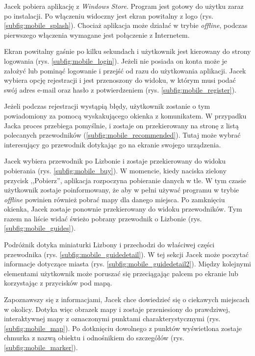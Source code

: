 \documentclass{book}
\begin{document}
		Jacek pobiera aplikację z \emph{Windows Store}. Program jest gotowy do użytku zaraz po instalacji. Po włączeniu widoczny jest ekran powitalny z logo (rys.\ref{subfig:mobile_splash}). Chociaż aplikacja może działać w trybie \emph{offline}, podczas pierwszego włączenia wymagane jest połączenie z Internetem. 
		
		Ekran powitalny gaśnie po kilku sekundach i użytkownik jest kierowany do strony logowania (rys. \ref{subfig:mobile_login}). Jeżeli nie posiada on konta może je założyć lub pominąć logowanie i przejść od razu do użytkowania aplikacji. Jacek wybiera opcję rejestracji i jest przenoszony do widoku, w którym musi podać swój adres e-mail oraz hasło z potwierdzeniem (rys. \ref{subfig:mobile_register}). 
		
		Jeżeli podczas rejestracji wystąpią błędy, użytkownik zostanie o tym powiadomiony za pomocą wyskakującego okienka z komunikatem. W przypadku Jacka proces przebiega pomyślnie, i zostaje on przekierowany na stronę z listą polecanych przewodników (\ref{subfig:mobile_recommended}). Tutaj może wybrać interesujący go przewodnik dotykając go na ekranie swojego urządzenia.
		
		Jacek wybiera przewodnik po Lizbonie i zostaje przekierowany do widoku pobierania (rys. \ref{subfig:mobile_buy}). W momencie, kiedy naciska zielony przycisk ,,Pobierz'', aplikacja rozpoczyna pobieranie danych w tle. W tym czasie użytkownik zostaje poinformowany, że aby w pełni używać programu w trybie \emph{offline} powinien również pobrać mapy dla danego miejsca. Po zamknięciu okienka, Jacek zostaje ponownie przekierowany do widoku przewodników. Tym razem na liście widać świeżo pobrany przewodnik o Lizbonie (rys. \ref{subfig:mobile_guides}). 
		
		Podróżnik dotyka miniaturki Lizbony i przechodzi do właściwej części przewodnika (rys. \ref{subfig:mobile_guidedetail}). W tej sekcji Jacek może poczytać informacje dotyczące miasta (rys. \ref{subfig:mobile_guidedetail2}). Między kolejnymi elementami użytkownik może poruszać się przeciągając palcem po ekranie lub korzystając z przycisków pod mapą. 
		
		Zapoznawszy się z informacjami, Jacek chce dowiedzieć się o ciekawych miejscach w okolicy. Dotyka więc obrazek mapy i zostaje przeniesiony do prawdziwej, interaktywnej mapy z oznaczonymi punktami charakterystycznymi (rys. \ref{subfig:mobile_map}). Po dotknięciu dowolnego z punktów wyświetlona zostaje chmurka z nazwą obiektu i odnośnikiem do szczegółów (rys. \ref{subfig:mobile_marker}). 
		
\end{document}
